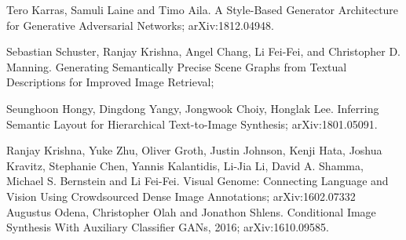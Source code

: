 \documentclass{article}
\begin{document}
\begin{thebibliography}{1}
Tero Karras, Samuli Laine and Timo Aila.
\newblock A Style-Based Generator Architecture for Generative Adversarial Networks;
\newblock arXiv:1812.04948.

Sebastian Schuster, Ranjay Krishna, Angel Chang,
Li Fei-Fei, and Christopher D. Manning.
\newblock Generating Semantically Precise Scene Graphs from Textual Descriptions for Improved Image Retrieval;

Seunghoon Hongy, Dingdong Yangy, Jongwook Choiy, Honglak Lee.
\newblock Inferring Semantic Layout for Hierarchical Text-to-Image Synthesis;
\newblock arXiv:1801.05091.


Ranjay Krishna, Yuke Zhu, Oliver Groth, Justin Johnson, Kenji Hata, Joshua Kravitz, Stephanie Chen, Yannis Kalantidis, Li-Jia Li, David A. Shamma, Michael S. Bernstein and Li Fei-Fei.
\newblock Visual Genome: Connecting Language and Vision Using Crowdsourced Dense Image Annotations;
\newblock arXiv:1602.07332
Augustus Odena, Christopher Olah and Jonathon Shlens.
\newblock Conditional Image Synthesis With Auxiliary Classifier GANs, 2016;
\newblock arXiv:1610.09585.


\end{thebibliography}

% 
\end{document}

